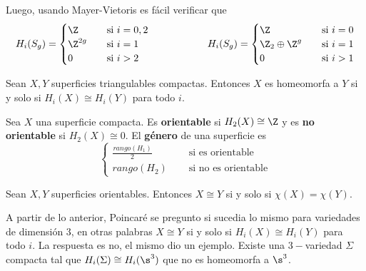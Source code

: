 \documentclass{article}
\begin{document}
\noindent Luego, usando Mayer-Vietoris es fácil verificar que
\begin{equation*}
    H_{i}(S_{g})=\begin{cases}
        \Z &\quad\text{si }i=0,2 \\
        \Z^{2g} &\quad\text{si }i=1 \\
        0 &\quad\text{si }i>2
    \end{cases}
    \hspace{2cm}
    H_{i}(S_{g})=\begin{cases}
        \Z &\quad\text{si }i=0 \\
        \Z_{2}\oplus\Z^{g} &\quad\text{si }i=1 \\
        0 &\quad\text{si }i>1
    \end{cases}
\end{equation*}

\begin{teo}
    Sean $X,Y$ superficies triangulables compactas. Entonces $X$ es homeomorfa a $Y$ si y solo si
    $H_{i}(X)\cong H_{i}(Y)$ para todo $i$.
\end{teo}

\vspace{2mm}
\begin{dfn}
    Sea $X$ una superficie compacta. Es \textbf{orientable} si $H_{2}(X)\cong\Z$ y es \textbf{no 
    orientable} si $H_{2}(X)\cong0$. El \textbf{género} de una superficie es
    \begin{equation*}
        \begin{cases}
            \frac{rango(H_{1})}{2} &\quad\text{ si es orientable} \\
            rango(H_{2}) &\quad\text{ si no es orientable}
        \end{cases}
    \end{equation*}
\end{dfn}

\vspace{2mm}
\begin{cor}
    Sean $X,Y$ superficies orientables. Entonces $X\cong Y$ si y solo si $\chi(X)=\chi(Y)$.
\end{cor}

\noindent A partir de lo anterior, Poincaré se pregunto si sucedia lo mismo para variedades de
dimensión $3$, en otras palabras $X\cong Y$ si y solo si $H_{i}(X)\cong H_{i}(Y)$ para todo $i$. 
La respuesta es no, el mismo dio un ejemplo. Existe una $3-$variedad $\Sigma$ compacta tal que
$H_{i}(\Sigma)\cong H_{i}(\s^{3})$ que no es homeomorfa a $\s^{3}$.
\end{document}

